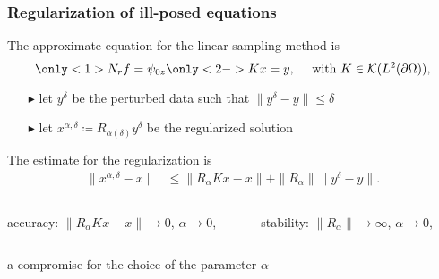 \documentclass[10pt,xcolor={dvipsnames}]{beamer}
\theoremstyle{plain}
\theoremstyle{plain}
\begin{document}
\begin{frame}
 \frametitle{Regularization of ill-posed equations}
{\footnotesize
The approximate equation for the linear sampling method is}
\begin{equation}
\only<1>{N_r f = \psi_{0z}}\only<2->{Kx = y, \quad\textup{ with }K\in\mathcal{K}(L^2(\partial\Omega)),}
\end{equation}
\vspace{-0.6cm}
{\footnotesize
\begin{itemize}
 \item[$\blacktriangleright$] let $y^\delta$ be the perturbed data such that $\|y^\delta - y\|\leq \delta$
 \item[$\blacktriangleright$] let $x^{\alpha,\delta}\coloneqq R_{\alpha(\delta)} y^\delta$ be the regularized solution
\end{itemize}
}
\begin{block}
{
\footnotesize
The estimate for the regularization is 
}
\vspace{-0.5cm}
\begin{align}
\label{eq:fundamental-error-estimate}
 \|x^{\alpha, \delta} - x\| 
&\leq \|R_\alpha Kx - x\| + \|R_\alpha\| \|y^\delta - y\|.
\end{align}
\begin{columns}[t]
 \begin{column}{0.5\textwidth}
  accuracy: $\|R_\alpha Kx -x\|\to0$, $\alpha\to0$,
 \end{column}
 \begin{column}{0.5\textwidth}
  stability: $\|R_\alpha\|\to\infty$, $\alpha\to0$,
 \end{column}
\end{columns}
a compromise for the choice of the parameter $\alpha$
\end{block}


\end{frame}
\end{document}

